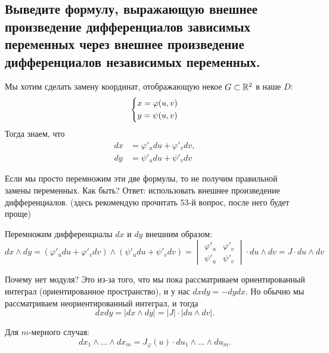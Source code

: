 \subsection{Выведите формулу, выражающую внешнее произведение дифференциалов зависимых переменных через внешнее произведение дифференциалов независимых переменных.}

Мы хотим сделать замену координат, отображающую некое $G \subset \mathbb{R}^2$ в наше $D$: 
\begin{equation*}
    \begin{dcases}
        x = \varphi(u, v)\\
        y = \psi(u, v)
    \end{dcases}
\end{equation*}
Тогда знаем, что
\begin{align*}
    dx &= \varphi'_u du + \varphi'_v dv,\\
    dy &= \psi'_u du + \psi'_v dv
\end{align*}

Если мы просто перемножим эти две формулы, то не получим правильной замены переменных. Как быть? Ответ: использовать внешнее произведение дифференциалов. (здесь рекомендую прочитать 53-й вопрос, после него будет проще)

Перемножим дифференциалы $dx$ и $dy$ внешним образом:
\begin{equation*}
    dx \wedge dy = (\varphi'_u du + \varphi'_v dv) \wedge (\psi'_u du + \psi'_v dv) = \begin{vmatrix}
        \varphi'_u & \varphi'_v \\
        \psi'_u & \psi'_v
    \end{vmatrix} \cdot du \wedge dv = J \cdot du \wedge dv
\end{equation*}

Почему нет модуля? Это из-за того, что мы пока рассматриваем ориентированный интеграл (ориентированное пространство), и у нас $dxdy = -dydx$. Но обычно мы рассматриваем неориентированный интеграл, и тогда 
\begin{equation*}
    dxdy = |dx \wedge dy| = |J| \cdot |du \wedge dv|.
\end{equation*}

Для $m$-мерного случая:
\begin{equation*}
    dx_1 \wedge \dots \wedge dx_m = J_\varphi(u) \cdot du_1 \wedge \dots \wedge du_m.
\end{equation*}
